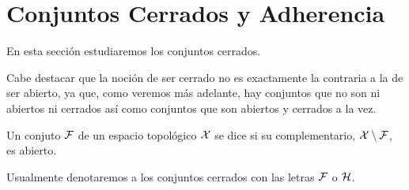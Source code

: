 \section{Conjuntos Cerrados y Adherencia}
\label{etop_cerradosAdherencia}
En esta sección estudiaremos los conjuntos cerrados.

Cabe destacar que la noción de ser cerrado no es exactamente la contraria a la de ser abierto, ya que, como veremos más adelante, hay conjuntos que no son ni abiertos ni cerrados así como conjuntos que son abiertos y cerrados a la vez.

\begin{defi}
	Un conjuto $\mathcal{F}$ de un espacio topológico $\mathcal{X}$ se dice  si su complementario, $\mathcal{X}\setminus\mathcal{F}$, es abierto.
\end{defi}

Usualmente denotaremos a los conjuntos cerrados con las letras $\mathcal{F}$ o $\mathcal{H}$.

